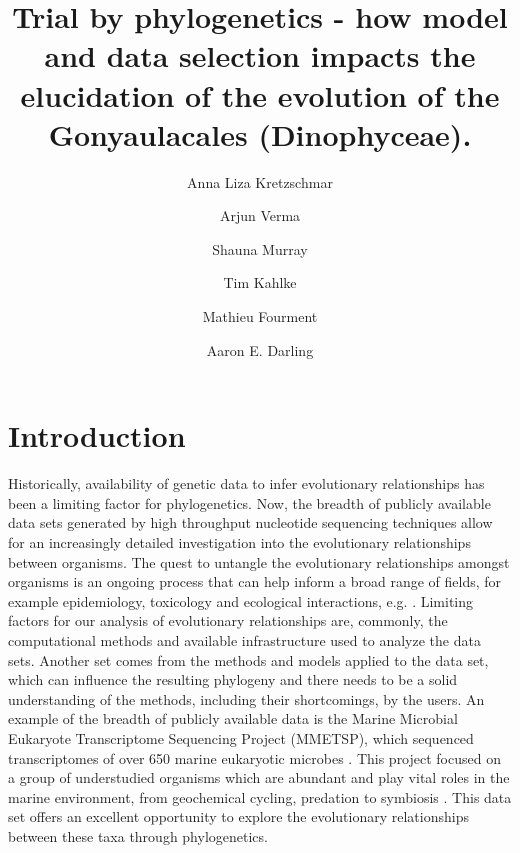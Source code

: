 \documentclass[fleqn,10pt,lineno]{wlpeerj} %
\title{Trial by phylogenetics - how model and data selection impacts the elucidation of the evolution of the Gonyaulacales (Dinophyceae).}
\author[1]{Anna Liza Kretzschmar}
\author[2]{Arjun Verma}
\author[2]{Shauna Murray}
\author[1]{Tim Kahlke}
\author[2]{Mathieu Fourment}
\author[2]{Aaron E. Darling}
\affil[1]{ithree institute, University of Technology Sydney, Australia}
\affil[2]{C3, University of Technology Sydney, Australia}
\begin{document}
\flushbottom
\maketitle
\thispagestyle{empty}

\section*{Introduction}
Historically, availability of genetic data to infer evolutionary relationships has been a limiting factor for phylogenetics.
Now, the breadth of publicly available data sets generated by high throughput nucleotide sequencing techniques allow for an increasingly detailed investigation into the evolutionary relationships between organisms.
The quest to untangle the evolutionary relationships amongst organisms is an ongoing process that can help inform a broad range of fields, for example epidemiology, toxicology and ecological interactions, e.g. \cite{mctavish2017and,lewis2008episodic,mutreja2011evidence,cavender2009merging,sites2011phylogenetic}.%
Limiting factors for our analysis of evolutionary relationships are, commonly, the computational methods and available infrastructure used to analyze the data sets. 
Another set comes from the methods and models applied to the data set, which can influence the resulting phylogeny and there needs to be a solid understanding of the methods, including their shortcomings, by the users.
An example of the breadth of publicly available data is the Marine Microbial Eukaryote Transcriptome Sequencing Project (MMETSP), which sequenced transcriptomes of over 650 marine eukaryotic microbes \cite{keeling2014marine}. 
This project focused on a group of understudied organisms which are abundant and play vital roles in the marine environment, from geochemical cycling, predation to symbiosis \cite{gomez2005list,gomez2012quantitative}. 
This data set offers an excellent opportunity to explore the evolutionary relationships between these taxa through phylogenetics. 
\end{document}

